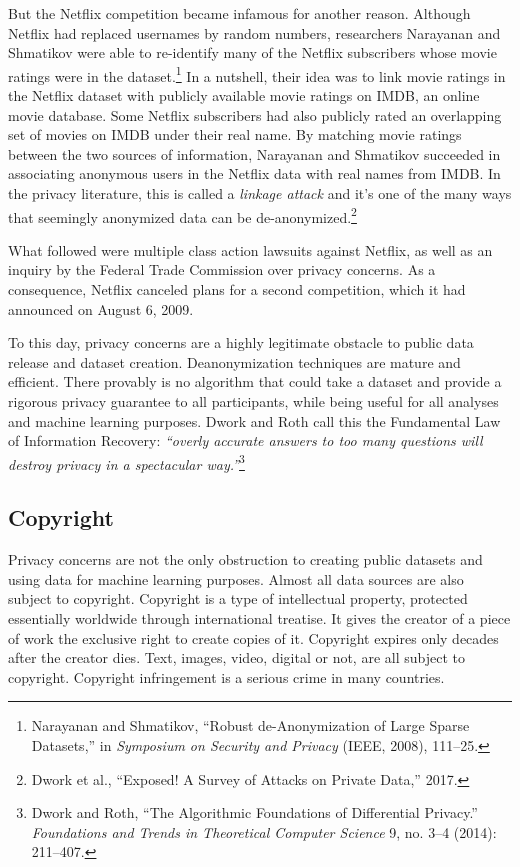 \documentclass{tufte-book}
\begin{document}
But the Netflix competition became infamous for another reason. Although
Netflix had replaced usernames by random numbers, researchers Narayanan
and Shmatikov were able to re-identify many of the Netflix subscribers
whose movie ratings were in the dataset.\footnote{Narayanan and
  Shmatikov, {``Robust de-Anonymization of Large Sparse Datasets,''} in
  \emph{Symposium on Security and Privacy} (IEEE, 2008), 111--25.} In a
nutshell, their idea was to link movie ratings in the Netflix dataset
with publicly available movie ratings on IMDB, an online movie database.
Some Netflix subscribers had also publicly rated an overlapping set of
movies on IMDB under their real name. By matching movie ratings between
the two sources of information, Narayanan and Shmatikov succeeded in
associating anonymous users in the Netflix data with real names from
IMDB. In the privacy literature, this is called a \emph{linkage attack}
and it's one of the many ways that seemingly anonymized data can be
de-anonymized.\footnote{Dwork et al., {``Exposed! A Survey of Attacks on
  Private Data,''} 2017.}

What followed were multiple class action lawsuits against Netflix, as
well as an inquiry by the Federal Trade Commission over privacy
concerns. As a consequence, Netflix canceled plans for a second
competition, which it had announced on August 6,
2009.

To this day, privacy concerns are a highly legitimate obstacle to public
data release and dataset creation. Deanonymization techniques are mature
and efficient. There provably is no algorithm that could take a dataset
and provide a rigorous privacy guarantee to all participants, while
being useful for all analyses and machine learning purposes. Dwork and
Roth call this the Fundamental Law of Information Recovery:
\emph{``overly accurate answers to too many questions will destroy
privacy in a spectacular way.''}\footnote{Dwork and Roth, {``The
  Algorithmic Foundations of Differential Privacy.''} \emph{Foundations
  and Trends in Theoretical Computer Science} 9, no. 3--4 (2014):
  211--407.}

\hypertarget{copyright}{%
\subsection{Copyright}\label{copyright}}

Privacy concerns are not the only obstruction to creating public
datasets and using data for machine learning purposes. Almost all data
sources are also subject to copyright. Copyright is a type of
intellectual property, protected essentially worldwide through
international treatise. It gives the creator of a piece of work the
exclusive right to create copies of it. Copyright expires only decades
after the creator dies. Text, images, video, digital or not, are all
subject to copyright. Copyright infringement is a serious crime in many
countries.
\end{document}
